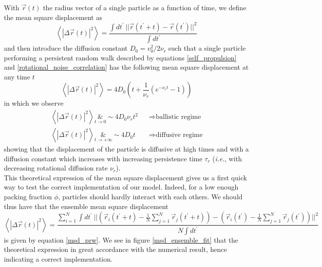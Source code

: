\documentclass[class=report, float=false, crop=false]{standalone}
\begin{document}
With $\vec{r}(t)$ the radius vector of a single particle as a function of time, we define the mean square displacement as
\begin{equation}
\left<|\Delta\vec{r}(t)|^2\right> = \frac{\int dt^{\prime}~ ||\vec{r}(t^{\prime} + t) - \vec{r}(t^{\prime})||^2}{\int dt^{\prime}}
\label{msd}
\end{equation}
and then introduce the diffusion constant $D_0 = v_0^2/2\nu_r$ such that a single particle performing a persistent random walk described by equations \ref{self_propulsion} and \ref{rotational_noise_correlation} has the following mean square displacement at any time $t$ \cite{fily2012athermal}
\begin{equation}
\left<|\Delta\vec{r}(t)|^2\right> = 4D_0\left(t + \frac{1}{\nu_r}\left(e^{-\nu_rt}-1\right)\right)
\label{msd_prw}
\end{equation}
in which we observe
\begin{equation}
\begin{aligned}
\left<|\Delta\vec{r}(t)|^2\right> \underset{t \rightarrow 0}&{\sim} 4 D_0 \nu_r t^2 &&\Rightarrow \text{ballistic regime}\\
\left<|\Delta\vec{r}(t)|^2\right> \underset{t \rightarrow +\infty}&{\sim} 4 D_0 t &&\Rightarrow \text{diffusive regime}
\end{aligned}
\label{msd_prw_limit}
\end{equation}
showing that the displacement of the particle is diffusive at high times and with a diffusion constant which increases with increasing persistence time $\tau_r$ (\textit{i.e.}, with decreasing rotational diffusion rate $\nu_r$).\\

This theoretical expression of the mean square displacement gives us a first quick way to test the correct implementation of our model. Indeed, for a low enough packing fraction $\phi$, particles should hardly interact with each others. We should thus have that the ensemble mean square displacement
\begin{equation}
\left<|\Delta\vec{r}(t)|^2\right> = \frac{\sum_{i=1}^N \int dt^{\prime}~ ||\left(\vec{r}_i(t^{\prime} + t) - \frac{1}{N}\sum_{j=1}^N\vec{r}_j(t^{\prime} + t)\right) - \left(\vec{r}_i(t^{\prime}) - \frac{1}{N}\sum_{j=1}^N \vec{r}_j(t^{\prime})\right)||^2}{N \int dt^{\prime}}
\label{msd_ensemble}
\end{equation}
is given by equation \ref{msd_prw}. We see in figure \ref{msd_ensemble_fit} that the theoretical expression in great accordance with the numerical result, hence indicating a correct implementation.
\end{document}
